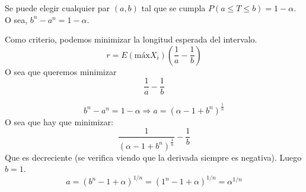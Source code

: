 \begin{enumerate}
		Se puede elegir cualquier par $(a,b)$ tal que se cumpla $P(a\leq T \leq b) = 1-\alpha$. O sea, $b^n - a^n = 1 - \alpha$.
		
		Como criterio, podemos minimizar la longitud esperada del intervalo.
		$$r = E(\text{máx} X_i) \left(\frac{1}{a} - \frac{1}{b}\right)$$
		O sea que queremos minimizar $$\frac{1}{a} - \frac{1}{b}$$
		
		$$b^n - a^n = 1 - \alpha\Rightarrow a = (\alpha - 1 +b^n)^{\frac{1}{n}}$$
		O sea que hay que minimizar:
		$$\frac{1}{(\alpha - 1 + b^n)^{\frac{1}{n}}} - \frac{1}{b}$$
		Que es decreciente (se verifica viendo que la derivada siempre es negativa). Luego $b=1$.
		$$a = (b^n - 1 + \alpha)^{1/n} = (1^n - 1 + \alpha)^{1/n} = \alpha^{1/n}$$
\end{enumerate}
